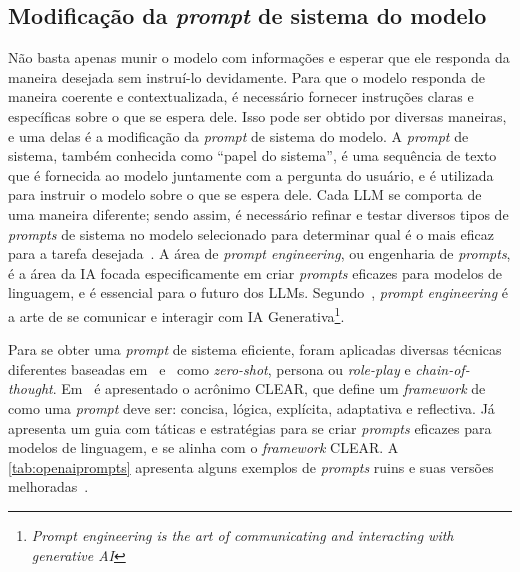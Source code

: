 \documentclass[journal]{IEEEtran}
\begin{document}
\subsection{Modificação da \textit{prompt} de sistema do modelo}

\noindent%
Não basta apenas munir o modelo com informações e esperar que ele responda da maneira desejada sem instruí-lo devidamente.
Para que o modelo responda de maneira coerente e contextualizada, é necessário fornecer instruções claras e específicas sobre o que se espera dele.
Isso pode ser obtido por diversas maneiras, e uma delas é a modificação da \textit{prompt} de sistema do modelo.
A \textit{prompt} de sistema, também conhecida como ``papel do sistema'', é uma sequência de texto que é fornecida ao modelo juntamente com a pergunta do usuário, e é utilizada para instruir o modelo sobre o que se espera dele.
Cada LLM se comporta de uma maneira diferente; sendo assim, é necessário refinar e testar diversos tipos de \textit{prompts} de sistema no modelo selecionado para determinar qual é o mais eficaz para a tarefa desejada~\cite{bozkurt2024tell,brown2020language,radford2019language,bsharat2023principled}.
A área de \textit{prompt engineering}, ou engenharia de \textit{prompts}, é a área da IA focada especificamente em criar \textit{prompts} eficazes para modelos de linguagem, e é essencial para o futuro dos LLMs.
Segundo~\cite{radford2019language}, \textit{prompt engineering} é a arte de se comunicar e interagir com IA Generativa\footnote{\textit{Prompt engineering is the art of communicating and interacting with generative AI}}.

Para se obter uma \textit{prompt} de sistema eficiente, foram aplicadas diversas técnicas diferentes baseadas em~\cite{doi:10.1080/10875301.2023.2227621,lo2023clear} e~\cite{openaipromptengineering,beurer2023prompting,mao2023large} como \textit{zero-shot}, persona ou \textit{role-play} e \textit{chain-of-thought}.
Em~\cite{doi:10.1080/10875301.2023.2227621,lo2023clear} é apresentado o acrônimo CLEAR, que define um \textit{framework} de como uma \textit{prompt} deve ser: concisa, lógica, explícita, adaptativa e reflectiva.
Já~\cite{openaipromptengineering} apresenta um guia com táticas e estratégias para se criar \textit{prompts} eficazes para modelos de linguagem, e se alinha com o \textit{framework} CLEAR\@.
A \autoref{tab:openaiprompts} apresenta alguns exemplos de \textit{prompts} ruins e suas versões melhoradas~\cite{openaipromptengineering}.
\end{document}
